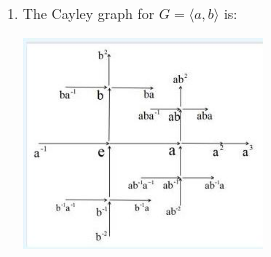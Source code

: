 \begin{example}
\begin{enumerate}
\item The Cayley graph for \(G = \langle a,b\rangle\) is:

\begin{center}
\includegraphics[width=0.5\textwidth]{images/Ch6_graph_F2.jpg}
\end{center}
\end{enumerate}
\end{example}